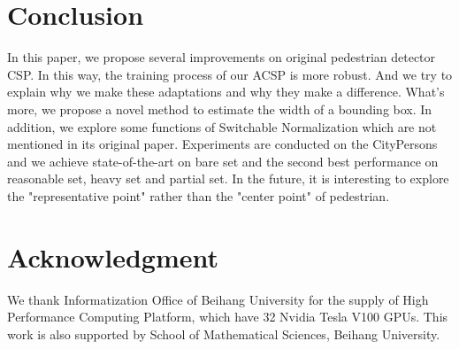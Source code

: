 \documentclass[twocolumn]{article}
\begin{document}
\section{Conclusion}
In this paper, we propose several improvements on original pedestrian detector CSP\cite{liu2019high}. In this way, the training process of our ACSP is more robust. And we try to explain why we make these adaptations and why they make a difference. What's more, we propose a novel method to estimate the width of a bounding box. In addition, we explore some functions of Switchable Normalization which are not mentioned in its original paper\cite{luo2018differentiable}. Experiments are conducted  on the CityPersons\cite{zhang2017citypersons} and we achieve state-of-the-art on bare set and  the second best performance on reasonable set, heavy set and partial set. In the future, it is interesting to explore the "representative point" rather than the "center point" of pedestrian.


\section{Acknowledgment}
We thank Informatization Office of Beihang University for the supply of High Performance Computing Platform, which have 32 Nvidia Tesla V100 GPUs. This work is also supported by  School of Mathematical Sciences, Beihang University.


\end{document}
